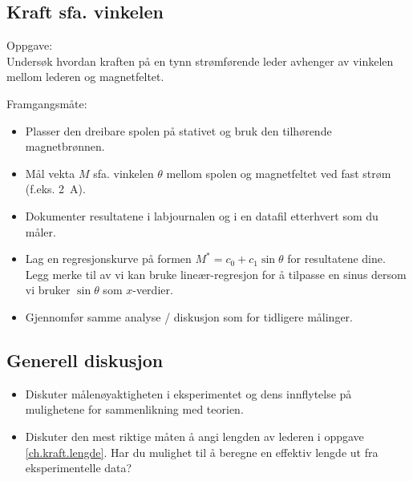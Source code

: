 \documentclass[../Elmag-labhefte-2020.tex]{subfiles}
\begin{document}

\subsection{Kraft sfa. vinkelen}

Oppgave: \\
{\itsf Undersøk hvordan kraften på en tynn strømførende leder avhenger av vinkelen mellom lederen og magnetfeltet.}

Framgangsmåte:
%
\vspace{-4mm} 
\begin{itemize}
    \item Plasser den dreibare spolen på stativet og bruk den tilhørende magnetbrønnen.
    \item Mål vekta $M$ sfa. vinkelen $\theta$ mellom spolen og magnetfeltet ved fast strøm (f.eks. \SI{2}{\ampere}). 
    \item Dokumenter resultatene i labjournalen og i en datafil etterhvert som du måler. %
    \item Lag en regresjonskurve på formen \(M^{*} = c_0 + c_1 \sin \theta\) for resultatene dine. Legg merke til av vi kan bruke lineær-regresjon for å tilpasse en sinus dersom vi bruker \(\sin \theta\) som \(x\)-verdier. 
    \item Gjennomfør samme analyse / diskusjon som for tidligere målinger. 
\end{itemize}

\subsection{Generell diskusjon}

\vspace{-4mm} 
\begin{itemize}
    \item Diskuter målenøyaktigheten i eksperimentet og dens innflytelse på mulighetene for sammenlikning med teorien. 
    \item Diskuter den mest riktige måten å angi lengden av lederen i oppgave \ref{ch.kraft.lengde}. Har du mulighet til å beregne en effektiv lengde ut fra eksperimentelle data?
\end{itemize}
\end{document}
